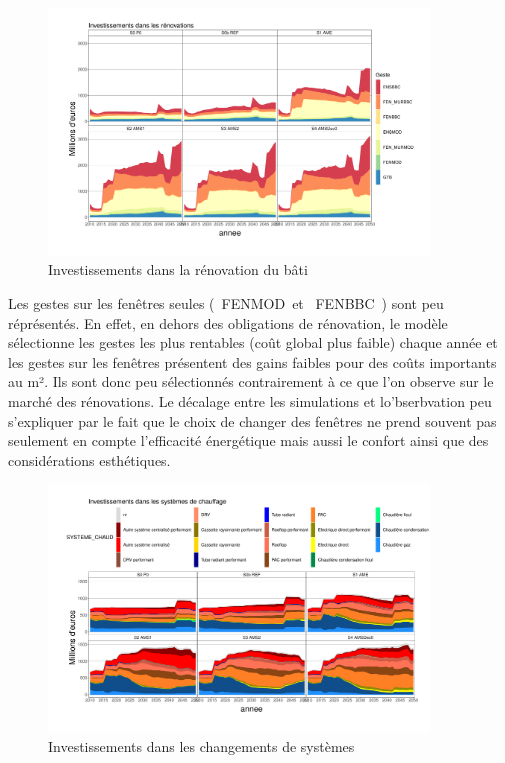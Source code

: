 \documentclass[10.5pt,a4paper]{article}
\begin{document}
{\begin{figure}[h!]
\centering 
\caption{Investissements dans la rénovation du bâti}\label{INV_Gestes-1}  
\includegraphics[width = 0.9\textwidth]{INV_Gestes-1}  
\end{figure}

Les gestes sur les fenêtres seules (\og~FENMOD~\fg et \og~FENBBC~\fg) sont peu réprésentés. En effet, en dehors des obligations de rénovation, le modèle sélectionne les gestes les plus rentables (coût global plus faible) chaque année et les gestes sur les fenêtres présentent des gains faibles pour des coûts importants au m². Ils sont donc peu sélectionnés contrairement à ce que l'on observe sur le marché des rénovations. Le décalage entre les simulations et lo'bserbvation peu s'expliquer par le fait que le choix de changer des fenêtres ne prend souvent pas seulement en compte l'efficacité énergétique mais aussi le confort ainsi que des considérations esthétiques. 


\begin{figure}[h!]
\centering 
\caption{Investissements dans les changements de systèmes}\label{INV_syst-1}  
\includegraphics[width = 0.9\textwidth]{INV_syst-1}  
\end{figure}

}
\end{document}
